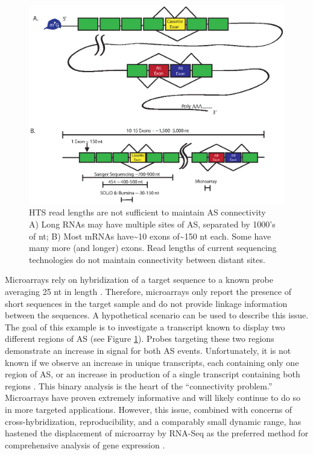     \begin{figure} %
      \centering 
      \includegraphics{Figures/Intro/SeqLengths_and_Connectivity.eps}
      \caption[HTS read lengths are not sufficient to maintain AS connectivity]
      {
        HTS read lengths are not sufficient to maintain AS connectivity\\[0.25cm]
        A) Long RNAs may have multiple sites of AS, separated by 1000's of nt; B) Most mRNAs have\textasciitilde10 exons of\textasciitilde150 nt each. Some have many more (and longer) exons. Read lengths of current sequencing technologies do not maintain connectivity between distant sites.
        }
      \label{Intro:fig:NoConnectivityInHTSMethods}
      \end{figure}

    Microarrays rely on hybridization of a target sequence to a known probe averaging 25 nt in length \citep{Southern2001}. Therefore, microarrays  only report the presence of short sequences in the target sample and do not provide linkage information between the sequences. A hypothetical scenario can be used to describe this issue. The goal of this example is to investigate a transcript known to display two different regions of AS (see Figure \ref{Intro:fig:NoConnectivityInHTSMethods}). Probes targeting these two regions demonstrate an increase in signal for both AS events. Unfortunately, it is not known if we observe an increase in unique transcripts, each containing only one region of AS, or an increase in production of a single transcript containing both regions \citep{Calarco2007}. This binary analysis is the heart of the ``connectivity problem.'' Microarrays have proven extremely informative and will likely continue to do so in more targeted applications. However, this issue, combined with concerns of cross-hybridization, reproducibility, and a comparably small dynamic range, has hastened the displacement of microarray by RNA-Seq as the preferred method for comprehensive analysis of gene expression \citep{Shendure2008}.

